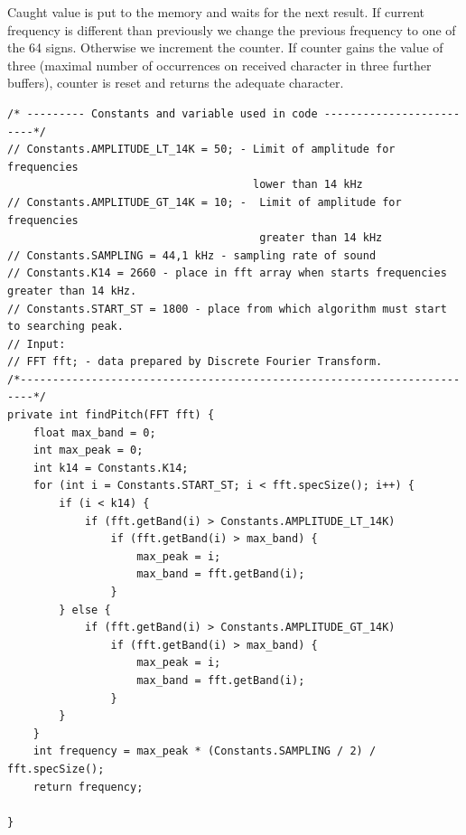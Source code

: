 \documentclass[11pt,titlepage]{article}
\theoremstyle{plain}
\begin{document}
Caught value is put to the memory and waits for the next result. If current frequency is different than previously we change the previous frequency to one of the 64 signs. Otherwise we increment the counter. If counter gains the value of three (maximal number of occurrences on received character in three further buffers), counter is reset and returns the adequate character.


\begin{minipage}{\linewidth}
\begin{lstlisting}
/* --------- Constants and variable used in code -------------------------*/
// Constants.AMPLITUDE_LT_14K = 50; - Limit of amplitude for frequencies
							          lower than 14 kHz		   
// Constants.AMPLITUDE_GT_14K = 10; -  Limit of amplitude for frequencies
									   greater than 14 kHz	
// Constants.SAMPLING = 44,1 kHz - sampling rate of sound
// Constants.K14 = 2660 - place in fft array when starts frequencies greater than 14 kHz.
// Constants.START_ST = 1800 - place from which algorithm must start to searching peak.
// Input:																   
// FFT fft; - data prepared by Discrete Fourier Transform.  
/*------------------------------------------------------------------------*/
private int findPitch(FFT fft) {
	float max_band = 0;
	int max_peak = 0;
	int k14 = Constants.K14;
	for (int i = Constants.START_ST; i < fft.specSize(); i++) {
		if (i < k14) {
			if (fft.getBand(i) > Constants.AMPLITUDE_LT_14K)
				if (fft.getBand(i) > max_band) {
					max_peak = i;
					max_band = fft.getBand(i);
				}
		} else {
			if (fft.getBand(i) > Constants.AMPLITUDE_GT_14K)
				if (fft.getBand(i) > max_band) {
					max_peak = i;
					max_band = fft.getBand(i);
				}
		}
	}
	int frequency = max_peak * (Constants.SAMPLING / 2) / fft.specSize();
	return frequency;

}
\end{lstlisting}
\end{minipage}
\end{document}
